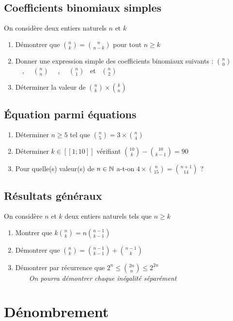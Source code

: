 \documentclass[oneside,12pt]{book}          %
\begin{document}
\subsection{Coefficients binomiaux simples}
On considère deux entiers naturels $n$ et $k$
\begin{enumerate}
    \item Démontrer que $\binom{n}{k}=\binom{n}{n-k}$ pour tout $n\geq k$
    \item Donner une expression simple des coefficients binomiaux suivants : $\binom{n}{0}$ ~~,~~ $\binom{n}{n}$ ~~,~~ $\binom{n}{1}$ ~et~ $\binom{n}{2}$
    \item Déterminer la valeur de $\binom{n}{k}\times\binom{k}{n}$
\end{enumerate}



\subsection{Équation parmi équations}
\begin{enumerate}
    \item Déterminer $n\geq5$ tel que $\binom{n}{5}=3\times\binom{n}{4}$
    \item Déterminer $k\in[\![1;10]\!]$ vérifiant $\binom{10}{k}-\binom{10}{k-1}=90$
    \item Pour quelle(s) valeur(s) de ${n\in\mathbb N}$ a-t-on $4\times\binom{n}{15}=\binom{n+1}{14}$ ?
\end{enumerate}



\subsection{Résultats généraux}
On considère $n$ et $k$ deux entiers naturels tels que $n\geq k$
\begin{enumerate}
    \item Montrer que $k\binom{n}{k}=n\binom{n-1}{k-1}$
    \item Démontrer que $\binom{n}{k}=\binom{n-1}{k-1}+\binom{n-1}{k}$
    \item Démontrer par récurrence que $2^n\leq\binom{2n}{n}\leq2^{2n}$\\
    ~~~~\textit{On pourra démontrer chaque inégalité séparément}
\end{enumerate}



\section{Dénombrement}
\end{document}

